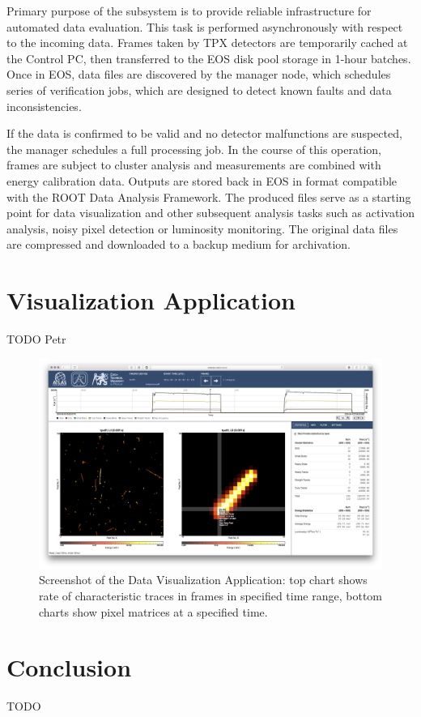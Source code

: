 \documentclass[journal]{IEEEtran}
\begin{document}
Primary purpose of the subsystem is to provide reliable infrastructure for automated data evaluation. This task is performed asynchronously with respect to the incoming data. Frames taken by TPX detectors are temporarily cached at the Control PC, then transferred to the EOS disk pool storage in 1-hour batches. Once in EOS, data files are discovered by the manager node, which schedules series of verification jobs, which are designed to detect known faults and data inconsistencies. 

If the data is confirmed to be valid and no detector malfunctions are suspected, the manager schedules a full processing job. In the course of this operation, frames are subject to cluster analysis \cite{Holy2008} and measurements are combined with energy calibration data. \cite{Jakubek2011} Outputs are stored back in EOS in format compatible with the ROOT Data Analysis Framework. \cite{ROOT} The produced files serve as a starting point for data visualization and other subsequent analysis tasks such as activation analysis, noisy pixel detection or luminosity monitoring. The original data files are compressed and downloaded to a backup medium for archivation.

\section{\label{sec:dal}Visualization Application}
TODO Petr
\cite{Manek2016}

\begin{figure}[tbp]
	\centering
        \includegraphics[clip, width=.45\textwidth, angle = 0 ]{Plots/screen-tpx01-crosshair-zoomed.png}
      \caption {Screenshot of the Data Visualization Application: top chart shows rate of characteristic traces in frames in specified time range, bottom charts show pixel matrices at a specified time.}
    \label{fig:positions}
\end{figure}


\section{\label{sec:conclusion}Conclusion}
TODO

%

%
\end{document}
